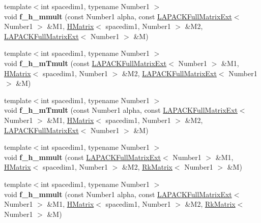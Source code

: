 \begin{DoxyCompactItemize}
\item 
\mbox{\label{classRkMatrix_a58df6eed9eb48d8d725476c8e289d859}} 
{\footnotesize template$<$int spacedim1, typename Number1 $>$ }\\void {\bfseries f\+\_\+h\+\_\+mmult} (const Number1 alpha, const \hyperlink{classLAPACKFullMatrixExt}{L\+A\+P\+A\+C\+K\+Full\+Matrix\+Ext}$<$ Number1 $>$ \&M1, \hyperlink{classHMatrix}{H\+Matrix}$<$ spacedim1, Number1 $>$ \&M2, \hyperlink{classLAPACKFullMatrixExt}{L\+A\+P\+A\+C\+K\+Full\+Matrix\+Ext}$<$ Number1 $>$ \&M)
\item 
\mbox{\label{classRkMatrix_a6a400c086f929a643da87cf6dc493c26}} 
{\footnotesize template$<$int spacedim1, typename Number1 $>$ }\\void {\bfseries f\+\_\+h\+\_\+m\+Tmult} (const \hyperlink{classLAPACKFullMatrixExt}{L\+A\+P\+A\+C\+K\+Full\+Matrix\+Ext}$<$ Number1 $>$ \&M1, \hyperlink{classHMatrix}{H\+Matrix}$<$ spacedim1, Number1 $>$ \&M2, \hyperlink{classLAPACKFullMatrixExt}{L\+A\+P\+A\+C\+K\+Full\+Matrix\+Ext}$<$ Number1 $>$ \&M)
\item 
\mbox{\label{classRkMatrix_ac2beff0c056d76818dc4e61dded73fe0}} 
{\footnotesize template$<$int spacedim1, typename Number1 $>$ }\\void {\bfseries f\+\_\+h\+\_\+m\+Tmult} (const Number1 alpha, const \hyperlink{classLAPACKFullMatrixExt}{L\+A\+P\+A\+C\+K\+Full\+Matrix\+Ext}$<$ Number1 $>$ \&M1, \hyperlink{classHMatrix}{H\+Matrix}$<$ spacedim1, Number1 $>$ \&M2, \hyperlink{classLAPACKFullMatrixExt}{L\+A\+P\+A\+C\+K\+Full\+Matrix\+Ext}$<$ Number1 $>$ \&M)
\item 
\mbox{\label{classRkMatrix_a66d1ce72cb294b2c4da6536250905a32}} 
{\footnotesize template$<$int spacedim1, typename Number1 $>$ }\\void {\bfseries f\+\_\+h\+\_\+mmult} (const \hyperlink{classLAPACKFullMatrixExt}{L\+A\+P\+A\+C\+K\+Full\+Matrix\+Ext}$<$ Number1 $>$ \&M1, \hyperlink{classHMatrix}{H\+Matrix}$<$ spacedim1, Number1 $>$ \&M2, \hyperlink{classRkMatrix}{Rk\+Matrix}$<$ Number1 $>$ \&M)
\item 
\mbox{\label{classRkMatrix_ac6da79ad8924c127c5eb34acf396cf00}} 
{\footnotesize template$<$int spacedim1, typename Number1 $>$ }\\void {\bfseries f\+\_\+h\+\_\+mmult} (const Number1 alpha, const \hyperlink{classLAPACKFullMatrixExt}{L\+A\+P\+A\+C\+K\+Full\+Matrix\+Ext}$<$ Number1 $>$ \&M1, \hyperlink{classHMatrix}{H\+Matrix}$<$ spacedim1, Number1 $>$ \&M2, \hyperlink{classRkMatrix}{Rk\+Matrix}$<$ Number1 $>$ \&M)

\end{DoxyCompactItemize}

